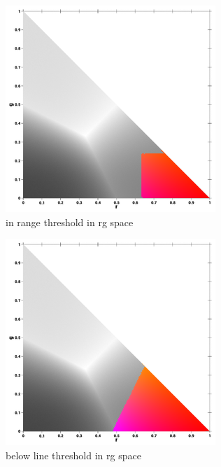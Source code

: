 \begin{multicols}{2}
	\begin{figure}[H]
		\centering
		\label{thresholdintrange}
		\includegraphics[width=1\linewidth]{figure/Analysis/inrangethresholdcolor.png}
		\caption{in range threshold in rg space}
	\end{figure}
	\columnbreak
	\begin{figure}[H]
		\centering
		\label{thresholdbelowline}
		\includegraphics[width=1\linewidth]{figure/Analysis/belowlinethresholdthresholdcolor.png}
		\caption{below line threshold in rg space}
	\end{figure}

\end{multicols}

